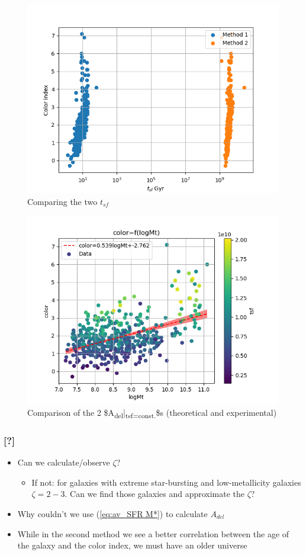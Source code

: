 \documentclass[a4paper,twocolumn]{article}
\begin{document}
\begin{figure}[!htpb]
\centering
\includegraphics[width=.9\linewidth]{./figs/tsf_tsf2.png}
\caption{\label{fig:Comparing the two $t_{sf}$}Comparing the two \(t_{sf}\)}
\end{figure}
\begin{figure}[!htpb]
\centering
\includegraphics[width=.9\linewidth]{./figs/logMt-color-color_tsf.png}
\caption{\label{fig:A_theor_A_exp_tsf}Comparison of the 2 \$A\textsubscript{del}|\textsubscript{tsf=const.}\$s (theoretical and experimental)}
\end{figure}

\subsubsection{[?]}
\label{sec:org2822411}
\begin{itemize}
\item Can we calculate/observe \(\zeta\)?
\begin{itemize}
\item If not: for galaxies with extreme star-bursting and low-metallicity galaxies \(\zeta=2-3\). Can we find those galaxies and approximate the \(\zeta\)?
\end{itemize}
\item Why couldn't we use (\ref{eq:av_SFR M*}) to calculate \(A_{del}\)
\item While in the second method we see a better correlation between the age of the galaxy and the color index, we must have an older universe
\end{itemize}
\end{document}
